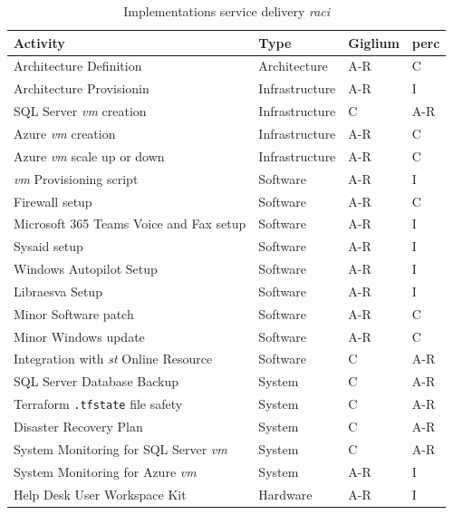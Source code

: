 \begin{table}[H]
	\centering
	\begin{tabular}{|l|l|l|l|} 
		\hline
		\textbf{Activity} & \textbf{Type} & \textbf{Giglium} & \textbf{\gls{perc}}   \\
		\hline
		Architecture Definition & Architecture & A-R  &  C  \\
		\hline
		Architecture Provisionin & Infrastructure & A-R & I  \\
		\hline
		SQL Server \textit{\gls{vm}} creation & Infrastructure & C & A-R  \\
		\hline
		Azure \textit{\gls{vm}} creation & Infrastructure & A-R & C  \\
		\hline
		Azure \textit{\gls{vm}} scale up or down & Infrastructure & A-R & C  \\
		\hline
		\textit{\gls{vm}} Provisioning script & Software & A-R & I \\
		\hline 
		Firewall setup & Software & A-R & C \\
		\hline 
		Microsoft 365 Teams Voice and Fax setup & Software & A-R & I \\
		\hline 
		Sysaid setup & Software & A-R & I \\
		\hline 
		Windows Autopilot Setup & Software & A-R & I \\
		\hline 
		Libraesva Setup & Software & A-R & I \\
		\hline 
		Minor Software patch & Software & A-R & C \\
		\hline 
		Minor Windows update & Software & A-R & C \\
		\hline 
		Integration with \textit{\gls{st}} Online Resource & Software & C & A-R \\
		\hline
		SQL Server Database Backup & System & C & A-R \\
		\hline 
		Terraform \texttt{.tfstate} file safety & System & C & A-R \\
		\hline 
		Disaster Recovery Plan & System & C & A-R \\
		\hline 
		System Monitoring for SQL Server \textit{\gls{vm}} & System & C & A-R \\
		\hline 
		System Monitoring for Azure \textit{\gls{vm}} & System & A-R & I \\
		\hline 
		Help Desk User Workspace Kit & Hardware & A-R & I \\
		\hline
	\end{tabular}
	\caption{Implementations service delivery \textit{\gls{raci}}}\label{tab:i_sd_raci}
\end{table}